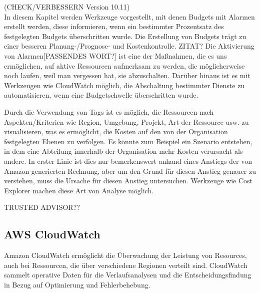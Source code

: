 (CHECK/VERBESSERN Version 10.11)\\
In diesem Kapitel werden Werkzeuge vorgestellt, mit denen Budgets mit Alarmen erstellt werden, diese informieren, wenn ein bestimmter Prozentsatz des festgelegten Budgets überschritten wurde. Die Erstellung von Budgets trägt zu einer besseren Planung-/Prognose- und Kostenkontrolle. ZITAT?
Die Aktivierung von Alarmen[PASSENDES WORT?] ist eine der Maßnahmen, die es uns ermöglichen, auf aktive Ressourcen aufmerksam zu werden, die möglicherweise noch laufen, weil man vergessen hat, sie abzuschalten.
Darüber hinaus ist es mit Werkzeugen wie CloudWatch möglich, die Abschaltung bestimmter Dienste zu automatisieren, wenn eine Budgetschwelle überschritten wurde.

Durch die Verwendung von Tags ist es möglich, die Ressourcen nach Aspekten/Kriterien wie Region, Umgebung, Projekt, Art der Ressource usw. zu visualisieren, was es ermöglicht, die Kosten auf den von der Organisation festgelegten Ebenen zu verfolgen. Es könnte zum Beispiel ein Szenario entstehen, in dem eine Abteilung innerhalb der Organisation mehr Kosten verursacht als andere. In erster Linie ist dies nur bemerkenswert anhand eines Anstiegs der von Amazon generierten Rechnung, aber um den Grund für diesen Anstieg genauer zu verstehen, muss die Ursache für diesen Anstieg untersuchen. Werkzeuge wie Cost Explorer machen diese Art von Analyse möglich.

TRUSTED ADVISOR??

\subsection{AWS CloudWatch}

Amazon CloudWatch ermöglicht die Überwachung der Leistung von Resources, auch bei Ressourcen, die über verschiedene Regionen verteilt sind.
CloudWatch sammelt operative Daten für die Verlaufsanalysen und die Entscheidungsfindung in Bezug auf Optimierung und Fehlerbehebung.

